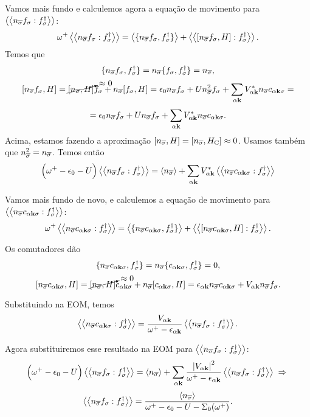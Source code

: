 \documentclass[a4paper,fleqn,12pt]{article}
\begin{document}
Vamos mais fundo e calculemos agora a equação de movimento para $\gf{n_{\cc{\sigma}} f_\sigma}{f_\sigma^\dagger}$:
$$
\omega^+ \gf{n_{\cc{\sigma}} f_\sigma}{f_\sigma^\dagger} =
\ev{\{n_{\cc{\sigma}} f_\sigma, f_\sigma^\dagger\}} +
\gf{[n_{\cc{\sigma}} f_\sigma, H]}{f_\sigma^\dagger}.
$$
Temos que
$$
\{n_{\overline{\sigma}} f_\sigma, f_\sigma^\dagger\} =
n_{\overline{\sigma}} \{f_\sigma, f_\sigma^\dagger\}= n_{\overline{\sigma}},
$$
$$
[n_{\overline{\sigma}} f_\sigma, H] = \cancelto{\approx 0}{[n_{\overline{\sigma}}, H]} f_\sigma +
n_{\overline{\sigma}} [f_\sigma, H] =
\epsilon_0 n_{\overline{\sigma}} f_\sigma + U n_{\overline{\sigma}}^2 f_\sigma +
\sum_{\alpha \vb{k}} V_{\alpha \vb{k}}^* n_{\overline{\sigma}} c_{\alpha \vb{k} \sigma} =
$$
$$
= \epsilon_0 n_{\overline{\sigma}} f_\sigma + U n_{\overline{\sigma}} f_\sigma +
\sum_{\alpha \vb{k}} V_{\alpha \vb{k}}^* n_{\overline{\sigma}} c_{\alpha \vb{k} \sigma}.
$$
Acima, estamos fazendo a aproximação $[n_{\overline{\sigma}}, H] = [n_{\overline{\sigma}}, H_{\text{C}}] \approx 0$. Usamos também que $n_{\overline{\sigma}}^2 = n_{\overline{\sigma}}$. Temos então
$$
\Big(
\omega^+ - \eps_0 - U
\Big) \gf{n_{\cc{\sigma}} f_\sigma}{f_\sigma^\dagger} =
\ev{n_{\cc{\sigma}}} +
\sum_{\alpha \k} V_{\alpha \k}^*
\gf{n_{\cc{\sigma}} c_{\alpha \k \sigma}}{f_\sigma^\dagger}
$$

Vamos mais fundo de novo, e calculemos a equação de movimento para $\gf{n_{\cc{\sigma}} c_{\alpha \k \sigma}}{f_\sigma^\dagger}$:
$$
\omega^+ \gf{n_{\cc{\sigma}} c_{\alpha \k \sigma}}{f_\sigma^\dagger} =
\ev{\{n_{\cc{\sigma}} c_{\alpha \k \sigma}, f_\sigma^\dagger\}} +
\gf{[n_{\cc{\sigma}} c_{\alpha \k \sigma}, H]}{f_\sigma^\dagger}.
$$

Os comutadores dão
$$
\{n_{\overline{\sigma}} c_{\alpha \vb{k} \sigma}, f_\sigma^\dagger\} =
n_{\overline{\sigma}} \{c_{\alpha \vb{k} \sigma}, f_\sigma^\dagger\} = 0,
$$
$$
[n_{\overline{\sigma}} c_{\alpha \vb{k} \sigma}, H] =
\cancelto{\approx 0}{[n_{\overline{\sigma}}, H]} c_{\alpha \vb{k} \sigma} +
n_{\overline{\sigma}} [c_{\alpha \vb{k} \sigma}, H] =
\epsilon_{\alpha \vb{k}} n_{\overline{\sigma}} c_{\alpha \vb{k} \sigma} +
V_{\alpha \vb{k}} n_{\overline{\sigma}} f_\sigma.
$$

Substituindo na EOM, temos
$$
\gf{n_{\cc{\sigma}} c_{\alpha \k \sigma}}{f_\sigma^\dagger} =
\frac{V_{\alpha \k}}{\omega^+  - \eps_{\alpha \k}}
\gf{n_{\cc{\sigma}} f_\sigma}{f_\sigma^\dagger}.
$$

Agora substituiremos esse resultado na EOM para $\gf{n_{\cc{\sigma}} f_\sigma}{f_\sigma^\dagger}$:
$$
\Big(
\omega^+ - \eps_0 - U
\Big) \gf{n_{\cc{\sigma}} f_\sigma}{f_\sigma^\dagger} =
\ev{n_{\cc{\sigma}}} +
\sum_{\alpha \k} \frac{\abs{V_{\alpha \k}}^2}{\omega^+  - \eps_{\alpha \k}}
\gf{n_{\cc{\sigma}} f_\sigma}{f_\sigma^\dagger} \implies
$$
$$
\gf{n_{\cc{\sigma}} f_\sigma}{f_\sigma^\dagger} =
\frac{\ev{n_{\cc{\sigma}}}}{\omega^+ - \eps_0 - U - \Sigma_0(\omega^+)}.
$$
\end{document}
